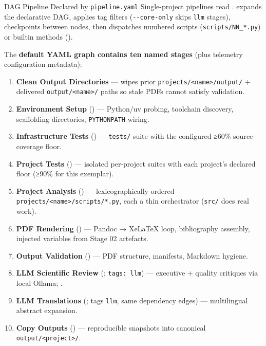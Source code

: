 \documentclass[
  ignorenonframetext,
]{beamer}
\author{\texorpdfstring{}{}}
\date{}
\providecommand{\tightlist}{%
  \setlength{\itemsep}{0pt}\setlength{\parskip}{0pt}}
\begin{document}
\begin{frame}{DAG Pipeline Declared by
\texttt{pipeline.yaml}}
\protect{}\label{dag-pipeline-declared-by-pipeline.yaml}
Single-project pipelines read
.
 expands the declarative
DAG, applies tag filters (\texttt{-\/-core-only} skips \texttt{llm}
stages), checkpoints between nodes, then dispatches numbered scripts
(\texttt{scripts/NN\_*.py}) or builtin methods
().

The \textbf{default YAML graph contains ten named stages} (plus
telemetry configuration metadata):

\begin{enumerate}
\tightlist
\item
  \textbf{Clean Output Directories} --- wipes prior
  \texttt{projects/\textless{}name\textgreater{}/output/} + delivered
  \texttt{output/\textless{}name\textgreater{}/} paths so stale PDFs
  cannot satisfy validation.
\item
  \textbf{Environment Setup} () ---
  Python/uv probing, toolchain discovery, scaffolding directories,
  \texttt{PYTHONPATH} wiring.
\item
  \textbf{Infrastructure Tests}
  () --- \texttt{tests/} suite
  with the configured ≥60\% source-coverage floor.
\item
  \textbf{Project Tests} ()
  --- isolated per-project suites with each project's declared floor
  (≥90\% for this exemplar).
\item
  \textbf{Project Analysis} () ---
  lexicographically ordered
  \texttt{projects/\textless{}name\textgreater{}/scripts/*.py}, each a
  thin orchestrator (\texttt{src/} does real work).
\item
  \textbf{PDF Rendering} () --- Pandoc →
  XeLaTeX loop, bibliography assembly, injected variables from Stage 02
  artefacts.
\item
  \textbf{Output Validation} () --- PDF
  structure, manifests, Markdown hygiene.
\item
  \textbf{LLM Scientific Review}
  (; \texttt{tags:\ llm})
  --- executive + quality critiques via local Ollama;
  .
\item
  \textbf{LLM Translations}
  (; tags
  \texttt{llm}, same dependency edges) --- multilingual abstract
  expansion.
\item
  \textbf{Copy Outputs} () --- reproducible
  snapshots into canonical
  \texttt{output/\textless{}project\textgreater{}/}.
\end{enumerate}


\end{frame}
\end{document}

